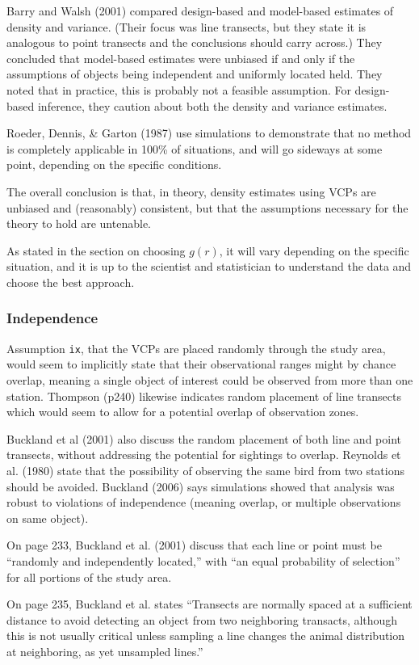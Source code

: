 \documentclass[12pt]{article}
\begin{document}
Barry and Walsh (2001) compared design-based and  model-based estimates of density and variance. (Their focus was line transects, but they state it is analogous to point transects and the conclusions should carry across.) They concluded that model-based estimates were unbiased if and only if the assumptions of objects being independent and uniformly located held. They noted that in practice, this is probably not a feasible assumption. For design-based inference, they caution about both the density and variance estimates.

Roeder, Dennis, \& Garton (1987) use simulations to demonstrate that no method is completely applicable in 100\% of situations, and will go sideways at some point, depending on the specific conditions.

The overall conclusion is that, in theory, density estimates using VCPs are unbiased and (reasonably) consistent, but that the assumptions necessary for the theory to hold are untenable. 

As stated in the section on choosing $g(r)$, it will vary depending on the specific situation, and it is up to the scientist and statistician to understand the data and choose the best approach.

\subsubsection{Independence}
Assumption \texttt{ix}, that the VCPs are placed randomly through the study area, would seem to implicitly state that their observational ranges might by chance overlap, meaning a single object of interest could be observed from more than one station. Thompson (p240) likewise indicates random placement of line transects which would seem to allow for a potential overlap of observation zones. 

Buckland et al (2001) also discuss the random placement of both line and point transects, without addressing the potential for sightings to overlap. Reynolds et al. (1980) state that the possibility of observing the same bird from two stations should be avoided. Buckland (2006) says simulations showed that analysis was robust to violations of independence (meaning overlap, or multiple observations on same object).

On page 233, Buckland et al. (2001) discuss that each line or point must be ``randomly and independently located,'' with ``an equal probability of selection'' for all portions of the study area.

On page 235, Buckland et al. states ``Transects are normally spaced at a sufficient distance to avoid detecting an object from two neighboring transacts, although this is not usually critical unless sampling a line changes the animal distribution at neighboring, as yet unsampled lines.''
\end{document}
